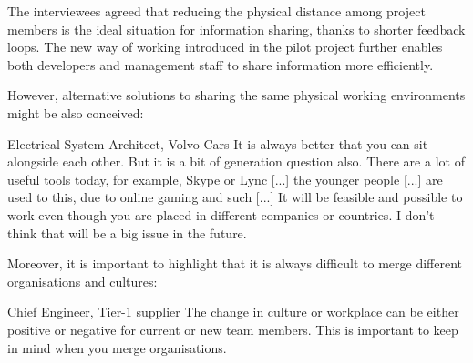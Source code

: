  The interviewees agreed that reducing the physical distance among project members is the ideal situation for information sharing, thanks to shorter feedback loops. The new way of working introduced in the pilot project further enables both developers and management staff to share information more efficiently.  %

However, alternative solutions to sharing the same physical working environments might be also conceived:

\begin{aquote}{Electrical System Architect, Volvo Cars}
It is always better that you can sit alongside each other. But it is a bit of generation question also. There are a lot of useful tools today, for example, Skype or Lync [...] the younger people [...] %
are used to this, due to online gaming and such [...] %
It will be feasible and possible to work even though you are placed in different companies or countries. I don't think that will be a big issue in the future.
\end{aquote}

Moreover, it is important to highlight that it is always difficult to merge different organisations and cultures:

\begin{aquote}{Chief Engineer, Tier-1 supplier}
The change in culture or workplace can be either positive or negative for current or new team members. This is important to keep in mind when you merge organisations.
\end{aquote}

%
%
%


